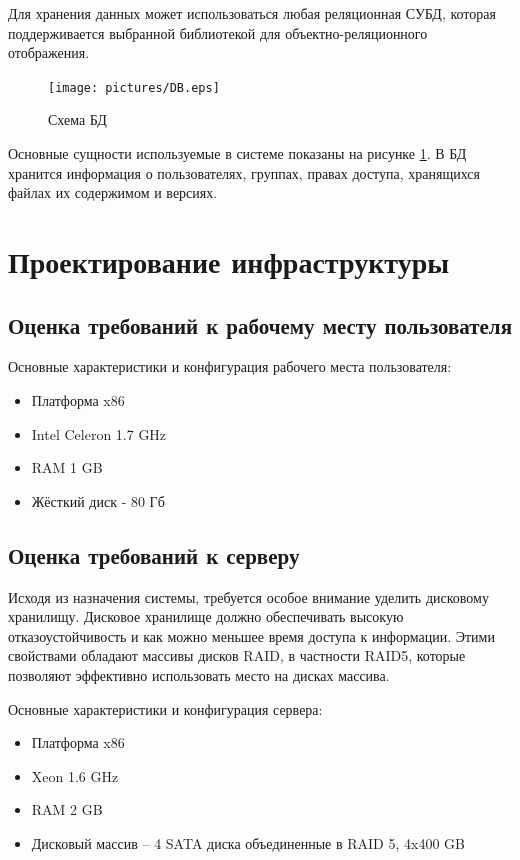 \documentclass[utf8,usehyperref,12pt]{G7-32}
\begin{document}
Для хранения данных может использоваться любая реляционная СУБД, которая поддерживается выбранной библиотекой для объектно-реляционного отображения.

\begin{figure}[ht]
   \centering%
   \texttt{[image: pictures/DB.eps]}
   \caption{Схема БД}\label{fig:db_scheme}
 \end{figure}

Основные сущности используемые в системе показаны на рисунке \ref{fig:db_scheme}. В БД хранится информация о пользователях, группах, правах доступа, хранящихся файлах их содержимом и версиях.


\section{Проектирование инфраструктуры}

\subsection{Оценка требований к рабочему месту пользователя}
Основные характеристики и конфигурация рабочего места пользователя:
\begin{itemize}
 \item Платформа x86
 \item Intel Celeron 1.7 GHz
 \item RAM 1 GB
 \item Жёсткий диск - 80 Гб
\end{itemize}

\subsection{Оценка требований к серверу}

Исходя из назначения системы, требуется особое внимание уделить дисковому хранилищу. Дисковое хранилище должно обеспечивать высокую отказоустойчивость и как можно меньшее время доступа к информации. Этими свойствами обладают массивы дисков RAID, в частности RAID5, которые позволяют эффективно использовать место на дисках массива.

Основные характеристики и конфигурация сервера:
\begin{itemize}
 \item Платформа x86
 \item Xeon 1.6 GHz
 \item RAM 2 GB
 \item Дисковый массив – 4 SATA диска объединенные в RAID 5, 4x400 GB
\end{itemize}
\end{document}
